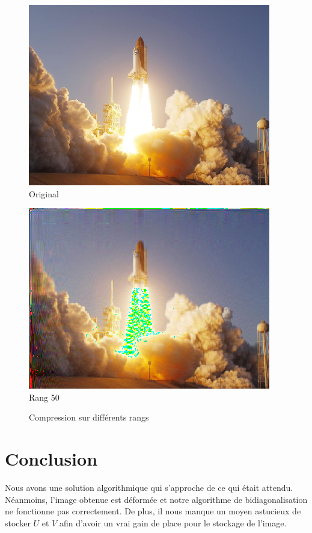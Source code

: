 \documentclass{article}
\begin{document}
\begin{figure}[H]
   \begin{minipage}{0.5\textwidth}
        \centering
        \includegraphics[width=0.9\linewidth]{original.png} \\
        Original
    \end{minipage}\hfill
   \begin{minipage}{0.5\textwidth}
        \centering
        \includegraphics[width=0.9\linewidth]{compression_rang_50.png} \\
        Rang 50
   \end{minipage}\hfill
   \caption{Compression sur différents rangs}
   \label{fig:compression-img}
\end{figure}

\section{Conclusion}
Nous avons une solution algorithmique qui s'approche de ce qui était attendu. Néanmoins, l'image obtenue est déformée et notre algorithme de bidiagonalisation ne fonctionne pas correctement. De plus, il nous manque un moyen astucieux de stocker $U$ et $V$ afin d'avoir un vrai gain de place pour le stockage de l'image.
\end{document}
